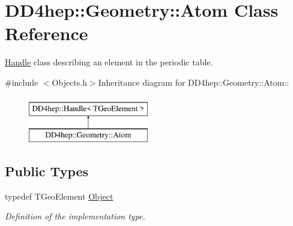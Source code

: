 \hypertarget{class_d_d4hep_1_1_geometry_1_1_atom}{
\section{DD4hep::Geometry::Atom Class Reference}
\label{class_d_d4hep_1_1_geometry_1_1_atom}
}


\hyperlink{class_d_d4hep_1_1_handle}{Handle} class describing an element in the periodic table.  


{\ttfamily \#include $<$Objects.h$>$}Inheritance diagram for DD4hep::Geometry::Atom::\begin{figure}[H]
\begin{center}
\leavevmode
\includegraphics[height=2cm]{class_d_d4hep_1_1_geometry_1_1_atom}
\end{center}
\end{figure}
\subsection*{Public Types}
\begin{DoxyCompactItemize}
\item 
typedef TGeoElement \hyperlink{class_d_d4hep_1_1_geometry_1_1_atom_a9fdd9fe52048018b3cba23bc9fb855fd}{Object}
\begin{DoxyCompactList}\small\item\em Definition of the implementation type. \item\end{DoxyCompactList}\end{DoxyCompactItemize}

